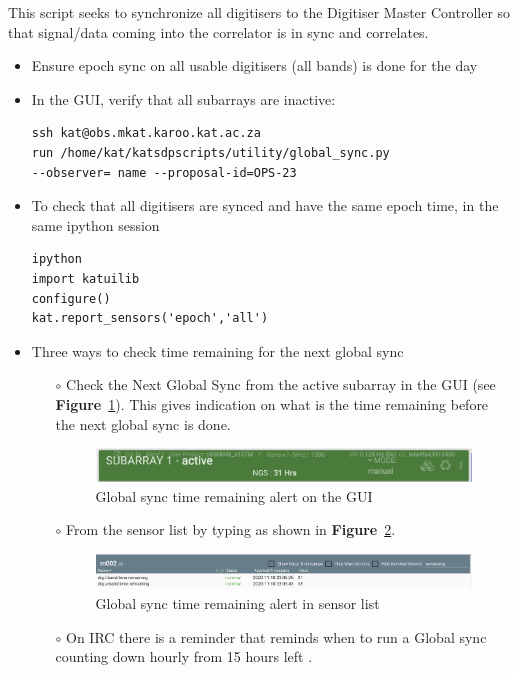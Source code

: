 This script seeks to synchronize all digitisers to the Digitiser Master Controller so that signal/data coming into the correlator is in sync and correlates. 
\begin{itemize}
\item{} Ensure epoch sync on all usable digitisers (all bands) is done for the day
\item{} In the GUI, verify that all subarrays are inactive:
\begin{lstlisting}[style=DOS]
ssh kat@obs.mkat.karoo.kat.ac.za
run /home/kat/katsdpscripts/utility/global_sync.py
--observer= name --proposal-id=OPS-23

\end{lstlisting}



\item To check that all digitisers are synced and have the same epoch time, in the
same ipython session
\begin{lstlisting}[style=DOS]
ipython
import katuilib
configure()
kat.report_sensors('epoch','all')
\end{lstlisting}

\item Three ways to check time remaining for the next global sync
\begin{itemize}


\item [$\circ$] Check the Next Global Sync from the active subarray in the GUI (see \textbf{Figure}~\ref{fig:image115}). This gives
indication on what is the time remaining before the next global sync is
done.
\begin{figure}[H]
	\centering
	\includegraphics[scale=0.46]{Chapters/images/image115.png}
	
	\caption{Global sync time remaining alert on the GUI }
	\label{fig:image115}
\end{figure}
\item [$\circ$] From the sensor list by typing  as shown in \textbf{Figure}~\ref{fig:image121}.
\begin{figure}[H]
	\centering
	\includegraphics[scale=0.23]{Chapters/images/image121.png}
	
	\caption{Global sync time remaining alert in sensor list}
	\label{fig:image121}
\end{figure}
\item [$\circ$] On IRC there is a reminder that reminds when to run a Global sync counting down
hourly from 15 hours left .
\end{itemize}
\end{itemize}


